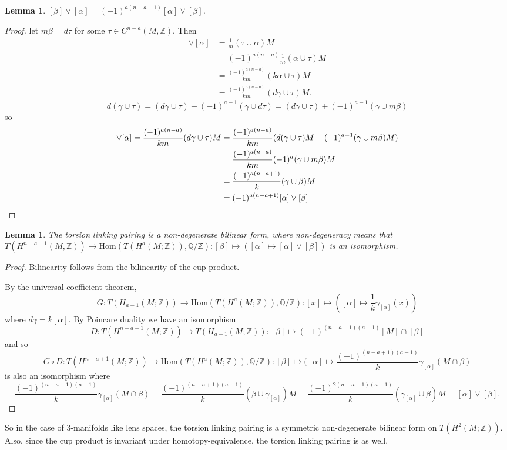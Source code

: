 \documentclass{article}
\newtheorem{lemma}[theorem]{Lemma}
\begin{document}
\begin{lemma}
$[\beta]\vee[\alpha]=(-1)^{a(n-a+1)}[\alpha]\vee[\beta]$.
\end{lemma}
\begin{proof}
let $m\beta=d\tau$ for some $\tau\in C^{n-a}(M,\mathbb{Z})$. Then 
\begin{align*}
[\beta]\vee[\alpha]&=\frac{1}{m}(\tau\cup\alpha)M\\&=(-1)^{a(n-a)}\frac{1}{m}(\alpha\cup\tau)M\\&=\frac{(-1)^{a(n-a)}}{km}(k\alpha\cup\tau)M\\&=\frac{(-1)^{a(n-a)}}{km}(d\gamma\cup\tau)M.\end{align*} \[d(\gamma\cup\tau)=(d\gamma\cup\tau)+(-1)^{a-1}(\gamma\cup d\tau)=(d\gamma\cup\tau)+(-1)^{a-1}(\gamma\cup m\beta)\] so \begin{align*}[\beta]\vee[\alpha]=\frac{(-1)^{a(n-a)}}{km}(d\gamma\cup\tau)M&=\frac{(-1)^{a(n-a)}}{km}(d(\gamma\cup\tau)M-(-1)^{a-1}(\gamma\cup m\beta)M)\\&=\frac{(-1)^{a(n-a)}}{km}(-1)^a(\gamma\cup m\beta)M\\&=\frac{(-1)^{a(n-a+1)}}{k}(\gamma\cup\beta)M\\&=(-1)^{a(n-a+1)}[\alpha]\vee[\beta]\qedhere\end{align*}
\end{proof}

\begin{lemma}
The torsion linking pairing is a non-degenerate bilinear form, where non-degeneracy means that $T(H^{n-a+1}(M,\mathbb{Z}))\to \text{Hom}(T(H^a(M;\mathbb{Z})),\mathbb{Q}/\mathbb{Z}):[\beta]\mapsto ([\alpha]\mapsto [\alpha]\vee[\beta])$ is an isomorphism.
\end{lemma}
\begin{proof}
Bilinearity follows from the bilinearity of the cup product.

\noindent By the universal coefficient theorem, \[G:T(H_{a-1}(M;\mathbb{Z}))\to\text{Hom}(T(H^a(M;\mathbb{Z})),\mathbb{Q}/\mathbb{Z}):[x]\mapsto([\alpha]\mapsto\frac{1}{k}\gamma_{[\alpha]}(x))\] where $d\gamma=k[\alpha]$. By Poincare duality we have an isomorphism \[D\colon T(H^{n-a+1}(M;\mathbb{Z}))\to T(H_{a-1}(M;\mathbb{Z})):[\beta]\mapsto(-1)^{(n-a+1)(a-1)}[M]\cap[\beta]\] and so \[G\circ D:T(H^{n-a+1}(M;\mathbb{Z}))\to\text{Hom}(T(H^a(M;\mathbb{Z})),\mathbb{Q}/\mathbb{Z})\colon [\beta]\mapsto([\alpha]\mapsto \frac{(-1)^{(n-a+1)(a-1)}}{k}\gamma_{[\alpha]}(M\cap\beta)\] is also an isomorphism where \[\frac{(-1)^{(n-a+1)(a-1)}}{k}\gamma_{[\alpha]}(M\cap\beta)=\frac{(-1)^{(n-a+1)(a-1)}}{k}(\beta\cup\gamma_{[\alpha]})M=\frac{(-1)^{2(n-a+1)(a-1)}}{k}(\gamma_{[\alpha]}\cup\beta)M=[\alpha]\vee[\beta].\]
\end{proof}
\noindent So in the case of 3-manifolds like lens spaces, the torsion linking pairing is a symmetric non-degenerate bilinear form on $T(H^2(M;\mathbb{Z}))$. Also, since the cup product is invariant under homotopy-equivalence, the torsion linking pairing is as well.
\end{document}
